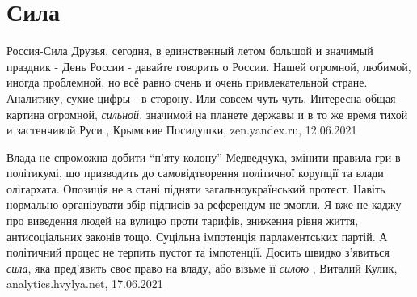  
 
 
 
 
\chapter{Сила}
\label{sec:slova.sila}

Россия-Сила
Друзья, сегодня, в единственный летом большой и значимый праздник - День России
- давайте говорить о России. Нашей огромной, любимой, иногда проблемной, но всё
равно очень и очень привлекательной стране.  Аналитику, сухие цифры - в
сторону. Или совсем чуть-чуть. Интересна общая картина огромной,
\emph{сильной}, значимой на планете державы и в то же время тихой и застенчивой
Руси
, 
Крымские Посидушки, zen.yandex.ru, 12.06.2021

Влада не спроможна добити \enquote{п'яту колону} Медведчука, змінити правила гри в
політикумі, що призводить до самовідтворення політичної корупції та влади
олігархата. Опозиція не в стані підняти загальноукраїнський протест. Навіть
нормально організувати збір підписів за референдум не змогли. Я вже не каджу
про виведення людей на вулицю проти тарифів, зниження рівня життя,
антисоціальних законів тощо. Суцільна імпотенція парламентських партій.  А
політичний процес не терпить пустот та імпотенції. Досить швидко з'явиться
\emph{сила}, яка пред'явить своє право на владу, або візьме її \emph{силою}
, 
Виталий Кулик, analytics.hvylya.net, 17.06.2021

